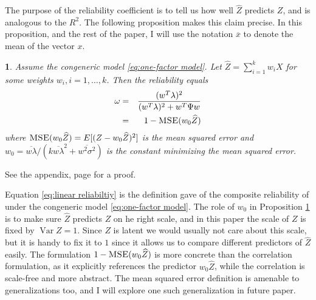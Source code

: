 \documentclass{article}
\makeatletter
\theoremstyle{plain}
\theoremstyle{plain}
\theoremstyle{definition}
\theoremstyle{remark}
\theoremstyle{definition}
\theoremstyle{plain}
\theoremstyle{plain}
\newtheorem{prop}[thm]{\protect\propositionname}
\theoremstyle{definition}
\newenvironment{proof}[1][\protect\proofname]{\par
	\normalfont\topsep6\p@\@plus6\p@\relax
	\trivlist
	\itemindent\parindent
	\item[\hskip\labelsep\scshape #1]\ignorespaces
}{%
	\endtrivlist\@endpefalse
}
\providecommand{\proofname}{Proof}
\providecommand{\propositionname}{Proposition}
\DeclareMathOperator{\Var}{Var}
\makeatother
\begin{document}
The purpose of the reliability coefficient is to tell us how well $\widehat{Z}$ predicts $Z$, and is analogous to the $R^2$. The following proposition makes this claim precise. In this proposition, and the rest of the paper, I will use the notation $\overline{x}$ to denote the mean of the vector $x$.

\begin{prop}
\label{prop:reliability motivation}Assume the congeneric model \eqref{eq:one-factor model}. Let $\widehat{Z}=\sum_{i=1}^{k}w_{i}X$
for some weights $w_{i},i=1,\ldots,k$. Then the reliability equals
\begin{eqnarray}
\omega & = & \frac{(w^{T}\lambda)^{2}}{(w^{T}\lambda)^{2}+w^{T}\Psi w}\label{eq:linear reliabiltiy}\\
 & = & 1-\textsc{MSE}(w_{0}\widehat{Z})\nonumber 
\end{eqnarray}
where $\textsc{MSE}(w_{0}\widehat{Z})=E[(Z-w_{0}\widehat{Z})^{2}]$ is the
mean squared error and $w_{0}=\overline{w\lambda}/(k\overline{w\lambda}^{2}+\overline{w^{2}\sigma^{2}})$ is the constant minimizing the mean squared error.
\end{prop}
\begin{proof}
See the appendix, page \pageref{proof:reliability motivation} for a proof.
\end{proof}

Equation \eqref{eq:linear reliabiltiy} is the definition \citet[][p. 112]{Joreskog1971-nn} gave of the composite reliability of under the congeneric model \eqref{eq:one-factor model}. The role of $w_0$ in Proposition \ref{prop:reliability motivation} is to make sure $\widehat{Z}$ predicts $Z$ on he right scale, and in this paper the scale of $Z$ is fixed by $\Var Z = 1$. Since $Z$ is latent we would usually not care about this scale, but it is handy to fix it to $1$ since it allows us to compare different predictors of $\widehat{Z}$ easily. The formulation $1-\textsc{MSE}(w_{0}\widehat{Z})$ is more concrete than the correlation formulation, as it explicitly references the predictor $w_{0}\widehat{Z}$, while the correlation is scale-free and more abstract. The mean squared error definition is amenable to generalizations too, and I will explore one such generalization in future paper. 
\end{document}
